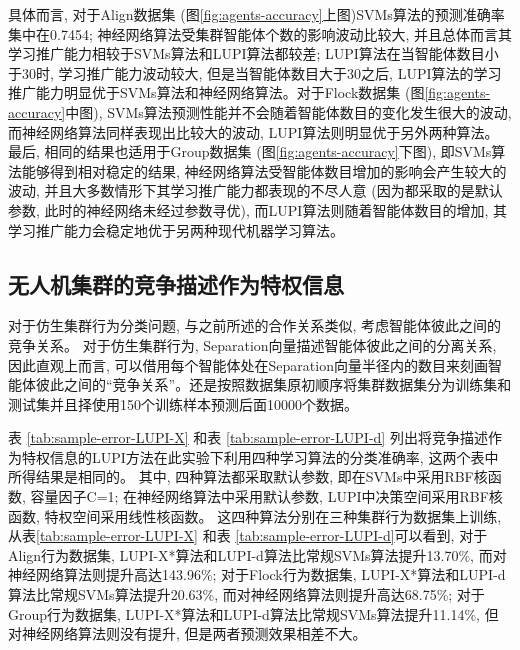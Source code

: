 具体而言, 对于Align数据集 (图\ref{fig:agents-accuracy}上图)SVMs算法的预测准确率集中在0.7454; 神经网络算法受集群智能体个数的影响波动比较大, 并且总体而言其学习推广能力相较于SVMs算法和LUPI算法都较差; LUPI算法在当智能体数目小于30时, 学习推广能力波动较大, 但是当智能体数目大于30之后, LUPI算法的学习推广能力明显优于SVMs算法和神经网络算法。对于Flock数据集 (图\ref{fig:agents-accuracy}中图), SVMs算法预测性能并不会随着智能体数目的变化发生很大的波动, 而神经网络算法同样表现出比较大的波动, LUPI算法则明显优于另外两种算法。 最后, 相同的结果也适用于Group数据集 (图\ref{fig:agents-accuracy}下图), 即SVMs算法能够得到相对稳定的结果, 神经网络算法受智能体数目增加的影响会产生较大的波动, 并且大多数情形下其学习推广能力都表现的不尽人意 (因为都采取的是默认参数, 此时的神经网络未经过参数寻优), 而LUPI算法则随着智能体数目的增加, 其学习推广能力会稳定地优于另两种现代机器学习算法。


\subsection{无人机集群的竞争描述作为特权信息}
对于仿生集群行为分类问题, 与之前所述的合作关系类似, 考虑智能体彼此之间的竞争关系。 对于仿生集群行为, Separation向量描述智能体彼此之间的分离关系, 因此直观上而言, 可以借用每个智能体处在Separation向量半径内的数目来刻画智能体彼此之间的“竞争关系”。还是按照数据集原初顺序将集群数据集分为训练集和测试集并且择使用150个训练样本预测后面10000个数据。

表 \ref{tab:sample-error-LUPI-X} 和表 \ref{tab:sample-error-LUPI-d} 列出将竞争描述作为特权信息的LUPI方法在此实验下利用四种学习算法的分类准确率, 这两个表中所得结果是相同的。 其中, 四种算法都采取默认参数, 即在SVMs中采用RBF核函数, 容量因子C=1; 在神经网络算法中采用默认参数, LUPI中决策空间采用RBF核函数, 特权空间采用线性核函数。 这四种算法分别在三种集群行为数据集上训练, 从表\ref{tab:sample-error-LUPI-X} 和表 \ref{tab:sample-error-LUPI-d}可以看到, 对于Align行为数据集, LUPI-X*算法和LUPI-d算法比常规SVMs算法提升13.70\%, 而对神经网络算法则提升高达143.96\%; 对于Flock行为数据集, LUPI-X*算法和LUPI-d算法比常规SVMs算法提升20.63\%, 而对神经网络算法则提升高达68.75\%; 对于Group行为数据集, LUPI-X*算法和LUPI-d算法比常规SVMs算法提升11.14\%, 但对神经网络算法则没有提升, 但是两者预测效果相差不大。



